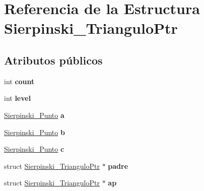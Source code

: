 \hypertarget{struct_sierpinski___triangulo_ptr}{}\section{Referencia de la Estructura Sierpinski\+\_\+\+Triangulo\+Ptr}
\label{struct_sierpinski___triangulo_ptr}
\subsection*{Atributos públicos}
\begin{DoxyCompactItemize}
\item 
int {\bfseries count}\hypertarget{struct_sierpinski___triangulo_ptr_a2ef553b14c0a14de721ec47b0eb3e0f8}{}\label{struct_sierpinski___triangulo_ptr_a2ef553b14c0a14de721ec47b0eb3e0f8}

\item 
int {\bfseries level}\hypertarget{struct_sierpinski___triangulo_ptr_adcbd2ee2da2b7d01dfc33f60484f464b}{}\label{struct_sierpinski___triangulo_ptr_adcbd2ee2da2b7d01dfc33f60484f464b}

\item 
\hyperlink{_sierpinski_8h_ae2ead4264dca03f8ac43836a96d0c4c5}{Sierpinski\+\_\+\+Punto} {\bfseries a}\hypertarget{struct_sierpinski___triangulo_ptr_a61e08446630673aa196f19972ef8a55c}{}\label{struct_sierpinski___triangulo_ptr_a61e08446630673aa196f19972ef8a55c}

\item 
\hyperlink{_sierpinski_8h_ae2ead4264dca03f8ac43836a96d0c4c5}{Sierpinski\+\_\+\+Punto} {\bfseries b}\hypertarget{struct_sierpinski___triangulo_ptr_acaba784c325dbf98c33eb011dbb624bc}{}\label{struct_sierpinski___triangulo_ptr_acaba784c325dbf98c33eb011dbb624bc}

\item 
\hyperlink{_sierpinski_8h_ae2ead4264dca03f8ac43836a96d0c4c5}{Sierpinski\+\_\+\+Punto} {\bfseries c}\hypertarget{struct_sierpinski___triangulo_ptr_a627930003618c1ee8cb840ce8528a280}{}\label{struct_sierpinski___triangulo_ptr_a627930003618c1ee8cb840ce8528a280}

\item 
struct \hyperlink{struct_sierpinski___triangulo_ptr}{Sierpinski\+\_\+\+Triangulo\+Ptr} $\ast$ {\bfseries padre}\hypertarget{struct_sierpinski___triangulo_ptr_abe230fa69157fe9e012d8a107dbda65a}{}\label{struct_sierpinski___triangulo_ptr_abe230fa69157fe9e012d8a107dbda65a}

\item 
struct \hyperlink{struct_sierpinski___triangulo_ptr}{Sierpinski\+\_\+\+Triangulo\+Ptr} $\ast$ {\bfseries ap}\hypertarget{struct_sierpinski___triangulo_ptr_a55a98f581f05ee809b23d94f7b4e3494}{}\label{struct_sierpinski___triangulo_ptr_a55a98f581f05ee809b23d94f7b4e3494}


\end{DoxyCompactItemize}

